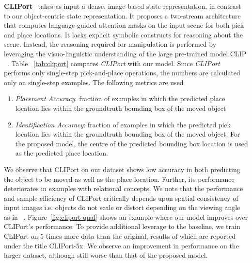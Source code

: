 \textbf{CLIPort}~\cite{shridhar2022cliport} takes as input a dense, image-based state representation, in contrast to our object-centric state representation. It proposes a two-stream architecture that computes language-guided attention masks on the input scene for both pick and place locations. It lacks explicit symbolic constructs for reasoning about the scene. Instead, the reasoning required for manipulation is performed by leveraging the visuo-linguistic understanding of the large pre-trained model CLIP ~\cite{clip}. Table ~\ref{tab:cliport} compares \emph{CLIPort} with our model. Since \emph{CLIPort} performs only single-step pick-and-place operations, the numbers are calculated only on single-step examples. The following metrics are used \begin{enumerate}
    \item \emph{Placement Accuracy}: fraction of examples in which the predicted place location lies within the groundtruth bounding box of the moved object
    \item \emph{Identification Accuracy}: fraction of examples in which the predicted pick location lies within the groundtruth bounding box of the moved object. For the proposed model, the centre of the predicted bounding box location is used as the predicted place location.
\end{enumerate}

We observe that CLIPort on our dataset shows low accuracy in both predicting the object to be moved as well as the place location. Further, its performance deteriorates in examples with relational concepts. We note that the performance and sample-efficiency of CLIPort critically depends upon  spatial consistency of input images i.e. objects do not scale or distort depending on the viewing angle as in ~\cite{shridhar2022cliport}. Figure~\ref{fig:cliport-qual} shows an example where our model improves over CLIPort's performance. To provide additional leverage to the baseline, we train CLIPort on 5 times more data than the original, results of which are reported under the title CLIPort-5x. We observe an improvement in performance on the larger dataset, although still worse than that of the proposed model. 


